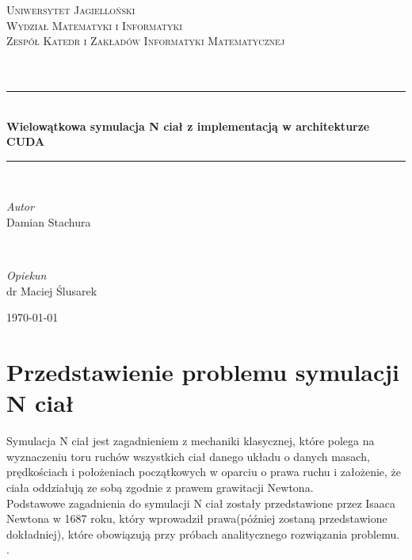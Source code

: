 \documentclass[14pt,twoside,a4paper]{article}
\theoremstyle{definition}
\begin{document}
\begin{titlepage}
	\newcommand{\HRule}{\rule{\linewidth}{0.5mm}}
	
	\center
	
	\textsc{\Large Uniwersytet  Jagielloński\\
			 Wydział Matematyki i Informatyki\\
    		 Zespół Katedr i Zakładów Informatyki Matematycznej}\\[1.5cm]
	
	\textsc{\Large}\\[0.5cm]
	
	\textsc{\Large}\\[0.5cm]
	
	\HRule\\[0.4cm]
		
	{\huge\bfseries Wielowątkowa symulacja N ciał z implementacją w architekturze CUDA}\\[0.4cm] %
	
	\HRule\\[1.5cm]
	
	\begin{minipage}{0.4\textwidth}
		\begin{flushleft}
			\large
			\textit{Autor}\\
			Damian Stachura%
		\end{flushleft}
	\end{minipage}
	~
	\begin{minipage}{0.4\textwidth}
		\begin{flushright}
			\large
			\textit{Opiekun}\\
			dr Maciej Ślusarek %
		\end{flushright}
	\end{minipage}
	
	\vfill\vfill %
	
	{\large\today} %
	
\end{titlepage}

\newpage
\tableofcontents

\newpage

\section{\LARGE Przedstawienie problemu symulacji N ciał}
\bigskip
Symulacja N ciał jest zagadnieniem z mechaniki klasycznej, które polega na wyznaczeniu toru ruchów wszystkich ciał danego układu o danych masach, prędkościach i położeniach początkowych w oparciu o prawa ruchu i założenie, że ciała oddziałują ze sobą zgodnie z prawem grawitacji Newtona. \\ 
Podstawowe zagadnienia do symulacji N ciał zostały przedstawione przez Isaaca Newtona w 1687 roku, który wprowadził prawa(później zostaną przedstawione dokładniej), które obowiązują przy próbach analitycznego rozwiązania problemu. \cite{Newton}.
\end{document}
